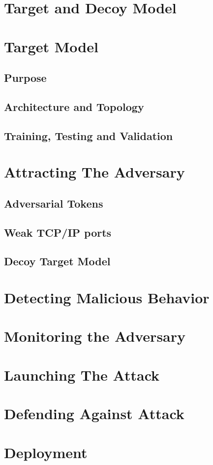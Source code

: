 \documentclass[grad,lot,lof,11pt,oneside,onehalfspace]{RUthesis}
\begin{document}
\section{Target and Decoy Model}
\section{Target Model}
\subsection{Purpose}
\subsection{Architecture and Topology}
\subsection{Training, Testing and Validation}
\newpage
\section{Attracting The Adversary}
\subsection{Adversarial Tokens}
\subsection{Weak TCP/IP ports}
\subsection{Decoy Target Model}
\section{Detecting Malicious Behavior}
\section{Monitoring the Adversary}
\section{Launching The Attack}
\section{Defending Against Attack}
\section{Deployment}
\end{document}
